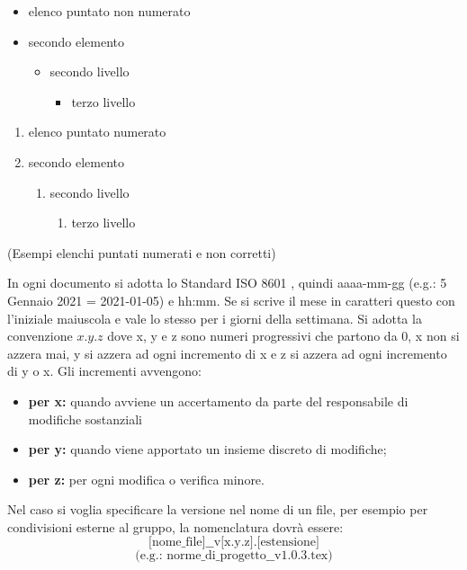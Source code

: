         \begin{multicols}{2}
            \begin{itemize}
                \item elenco puntato non numerato
                \item secondo elemento
                \begin{itemize}
                    \item secondo livello
                    \begin{itemize}
                        \item terzo livello
                    \end{itemize}
                \end{itemize}
            \end{itemize}
            \begin{enumerate}
                \item elenco puntato numerato
                \item secondo elemento
                \begin{enumerate}
                    \item secondo livello
                    \begin{enumerate}
                        \item terzo livello
                    \end{enumerate}
                \end{enumerate}
            \end{enumerate}
        \end{multicols}
        \centerline{(Esempi elenchi puntati numerati e non corretti)}
        In ogni documento si adotta lo Standard ISO 8601 , quindi aaaa-mm-gg (e.g.: 5 Gennaio 2021 = 2021-01-05) e hh:mm. Se si scrive il mese in caratteri questo con l'iniziale maiuscola e vale lo stesso per i giorni della settimana.
        \label{versions}
        Si adotta la convenzione $x.y.z$ dove x, y e z sono numeri progressivi che partono da 0, x non si azzera mai, y si azzera ad ogni incremento di x e z si azzera ad ogni incremento di y o x. Gli incrementi avvengono:
        \begin{itemize}
            \item \textbf{per x: }quando avviene un accertamento da parte del responsabile di modifiche sostanziali
            \item \textbf{per y: }quando viene apportato un insieme discreto di modifiche;
            \item \textbf{per z: }per ogni modifica o verifica minore.
        \end{itemize}
        Nel caso si voglia specificare la versione nel nome di un file, per esempio per condivisioni esterne al gruppo, la nomenclatura dovrà essere: $$\text{[nome\_file]\_\_v[x.y.z].[estensione]}$$ $$\text{(e.g.: norme\_di\_progetto\_\_v1.0.3.tex)}$$

